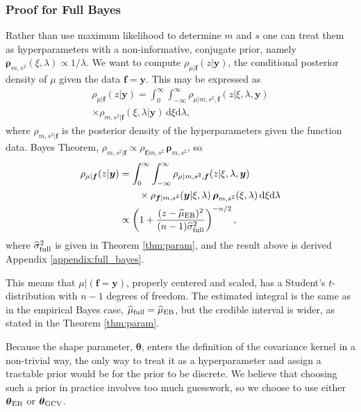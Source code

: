 \documentclass[twocolumn]{svjour3}          %
\newcommand{\bm}[1]{\boldsymbol{#1}}
\newcommand{\D}[1]{\text{d}{#1}}
\newcommand{\vtheta}{{\bm{\theta}}}
\newcommand{\vf}{\bm{f}}
\newcommand{\vrho}{\bm{\rho}}
\newcommand{\vy}{\bm{y}}
\newcommand{\hmu}{\widehat{\mu}}
\newcommand{\hsigma}{\widehat{\sigma}}
\newcommand{\MLE}{\textup{EB}}
\newcommand{\GCV}{\textup{GCV}}
\begin{document}
\subsubsection{Proof for Full Bayes} \label{sec:fullBayes}
Rather than use maximum likelihood to determine $m$ and $s$ one can treat them as hyperparameters with a non-informative, conjugate prior, namely $\vrho_{m,s^2}(\xi, \lambda) \propto 1/\lambda$. We want to compute $\rho_{\mu|\vf}(z | \vy)$, the conditional posterior density of $\mu$ given the data $\vf = \vy$.  This may be expressed as 
\begin{multline*}
    \rho_{\mu|\vf}(z | \vy) 
= \int_{0}^\infty \int_{-\infty}^\infty 
\rho_{\mu | m, s^2, \vf}(z | \xi, \lambda , \vy) \\
\times  \rho_{m, s^2 | \vf}(\xi, \lambda | \vy)  \, \D \xi \D \lambda, 
\end{multline*}
where $\rho_{m, s^2 | \vf}$ is the posterior density of the hyperparameters given the function data. Bayes Theorem, $\rho_{m, s^2 | \vf} \propto \rho_{\vf | m, s^2} \, \vrho_{m,s^2}$, so 
\begin{align}
\nonumber 
    \rho_{\mu|\vf}(z | \vy) 
& = \int_{0}^\infty \int_{-\infty}^\infty 
\rho_{\mu | m, s^2, \vf}(z | \xi, \lambda , \vy) \\
\nonumber
& \qquad \times  \rho_{\vf | m, s^2} (\vy | \xi, \lambda) \, \vrho_{m,s^2}(\xi,\lambda)  \, \D \xi \D \lambda \\
\nonumber
& \propto \left( 1 +  \frac{(z - \hmu_{\MLE})^2}{(n-1) \hsigma_{\textup{full}}^2} \right)^{-n/2},
\end{align}
where $\hsigma_{\textup{full}}^2$ is given in Theorem \ref{thm:param}, and the result above is derived Appendix \ref{appendix:full_bayes}.

This means that $\mu \vert (\vf = \vy )$, properly centered and scaled, has a Student's $t$-distribution with $n-1$ degrees of freedom.   The estimated integral is the same as in the empirical Bayes case, $\hmu_{\textup{full}} = \hmu_{\MLE}$, but the credible interval is wider, as stated in the Theorem \ref{thm:param}.

Because the shape parameter, $\vtheta$, enters the definition of the covariance kernel in a non-trivial way, the only way to treat it as a hyperparameter and assign a tractable prior would be for the prior to be discrete.  We believe that choosing such a prior in practice involves too much guesswork, so we choose to use either $\vtheta_\MLE$ or $\vtheta_\GCV$.
\end{document}
